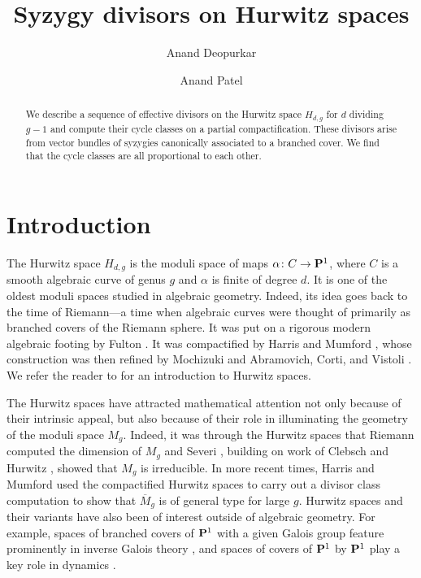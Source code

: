 \documentclass{amsart}
\title{Syzygy divisors on Hurwitz spaces}
\author{Anand Deopurkar \and Anand Patel}
\renewcommand {\P}{{\bf P}}
\providecommand {\from}{{\colon}}
\numberwithin{equation}{section}
\begin{document}
\maketitle

\begin{abstract}
  We describe a sequence of effective divisors on the Hurwitz space $H_{d,g}$ for $d$ dividing $g-1$ and compute their cycle classes on a partial compactification.
  These divisors arise from vector bundles of syzygies canonically associated to a branched cover.
  We find that the cycle classes are all proportional to each other.
\end{abstract}

\section{Introduction}
The Hurwitz space $H_{d,g}$ is the moduli space of maps $\alpha \from C \to \P^1$, where $C$ is a smooth algebraic curve of genus $g$ and $\alpha$ is finite of degree $d$.
It is one of the oldest moduli spaces studied in algebraic geometry.
Indeed, its idea goes back to the time of Riemann---a time when algebraic curves were thought of primarily as branched covers of the Riemann sphere.
It was put on a rigorous modern algebraic footing by Fulton \cite{ful:69}.
It was compactified by Harris and Mumford \cite{har.mum:82}, whose construction was then refined by Mochizuki \cite{moc:95} and Abramovich, Corti, and Vistoli \cite{abr.cor.vis:03}.
We refer the reader to \cite{rom.wew:06} for an introduction to Hurwitz spaces.

The Hurwitz spaces have attracted mathematical attention not only because of their intrinsic appeal, but also because of their role in illuminating the geometry of the moduli space $M_g$.
Indeed, it was through the Hurwitz spaces that Riemann \cite{rie:57} computed the dimension of $M_g$ and Severi \cite{sev:68}, building on work of Clebsch \cite{cle:73} and Hurwitz \cite{hur:01}, showed that $M_g$ is irreducible.
In more recent times, Harris and Mumford \cite{har.mum:82} used the compactified Hurwitz spaces to carry out a divisor class computation to show that $\overline M_g$ is of general type for large $g$.
Hurwitz spaces and their variants have also been of interest outside of algebraic geometry.
For example, spaces of branched covers of $\P^1$ with a given Galois group feature prominently in inverse Galois theory \cite{fri:77,fri.vol:91}, and spaces of covers of $\P^1$ by $\P^1$ play a key role in dynamics \cite{sil:98}.
\end{document}
